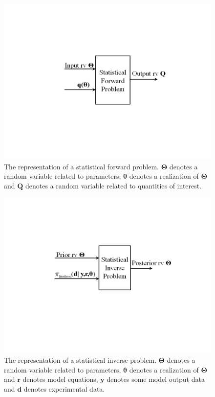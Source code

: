 \begin{figure}[h!]
\centerline{
\includegraphics[scale=0.45,clip=true,viewport=1.0in 2.5in 10.0in 5.5in]{figs/queso_paper1_09}
}
\caption{
The representation of a statistical forward problem.
$\boldsymbol{\Theta}$ denotes a random variable related to parameters,
$\boldsymbol{\theta}$ denotes a realization of $\boldsymbol{\Theta}$ and
$\mathbf{Q}$ denotes a random variable related to quantities of interest.
}
\label{fig-sfp-queso}
\end{figure}

\begin{figure}[h!]
\centerline{
\includegraphics[scale=0.45,clip=true,viewport=1.0in 3.0in 10.0in 5.5in]{figs/queso_paper1_10}
}
\caption{
The representation of a statistical inverse problem.
$\boldsymbol{\Theta}$ denotes a random variable related to parameters,
$\boldsymbol{\theta}$ denotes a realization of $\boldsymbol{\Theta}$ and
$\mathbf{r}$ denotes model equations,
$\mathbf{y}$ denotes some model output data and
$\mathbf{d}$ denotes experimental data.
}
\label{fig-sip-queso}
\end{figure}


